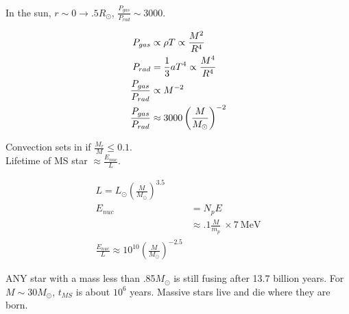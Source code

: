 In the sun, $r \sim 0 \rightarrow .5 R_\odot$, $\frac{P_{gas}}{P_{rad}} \sim 3000$.

\begin{align}
P_{gas} &\propto \rho T \propto \frac{M^2}{R^4}\\
P_{rad}& = \frac{1}{3}a T^4 \propto \frac{M^4}{R^4}\\
\frac{P_{gas}}{P_{rad}} &\propto M^{-2}\\
\frac{P_{gas}}{P_{rad}} &\approx 3000 \left( \frac{M}{M_\odot} \right)^{-2}
\end{align}

Convection sets in if $\frac{M_r}{M} \leq 0.1$. \\

Lifetime of MS star $\approx \frac{E_{nuc}}{L}$. 

\begin{align}
L = L_\odot \left( \frac{M}{M_\odot} \right)^{3.5}\\
E_{nuc} &= N_p E\\
&  \approx  .1 \frac{M}{m_p}~\times 7 ~\text{MeV}\\
\frac{E_{nuc}}{L} \approx 10^{10} \left( \frac{M}{M_\odot} \right)^{-2.5}
\end{align}

ANY star with a mass less than .85$M_\odot$ is still fusing after 13.7 billion years. For $M \sim 30 M_\odot$, $t_{MS}$ is about $10^6$ years. Massive stars live and die where they are born. 